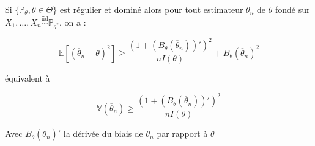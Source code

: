 \documentclass[12pt]{article}
\newif\ifcorrection
\newcommand{\corr}[1]{\ifcorrection{\color{lightblue}#1\color{black}}\fi}
\newcommand{\petitespace}{\vspace{0.5cm}}
\newcommand{\shift}{\hspace{2em}}
\newcommand{\bb}[1]{\mathbb{#1}} %
\renewcommand{\P}{\bb{P}}%
\renewcommand{\d}{\partial} %
\newcommand{\somme}[2]{\sum\limits_{#1}^{#2}}
\renewcommand{\cal}{\mathcal}
\newcommand{\Xunan}{X_1,\ldots,X_n} %
\newcommand{\esp}[1]{\bb{ E} \mathopen{}\left[#1\right]} %
\newcommand{\Var}[1]{\bb{ V} \mathopen{}\left(#1\right)} %
\newcommand{\cov}{\text{Cov}}
\newcommand{\modelstat}{\{ \P_\theta, \theta \in \Theta\}}
\newcommand{\esptheta}[1]{\bb{E}_\theta[#1]}
\newcommand{\simiid}{\overset{\text{iid}}{\sim}}
\newcommand{\1}{\bb{1}} %
\begin{document}
Si $\modelstat$ est régulier et dominé alors pour tout estimateur $\overline \theta_n$ de $\theta$ fondé sur $\Xunan \simiid \P_{\theta^*}$, on a : 

$$\esp{(\overline \theta_n-\theta)^2} \ge \frac{(1+(B_\theta(\overline \theta_n))')^2}{nI(\theta)} + B_\theta(\overline \theta_n)^2 $$

équivalent à 

$$\Var{\overline \theta_n} \ge \frac{(1+(B_\theta(\overline \theta_n))')^2}{nI(\theta)}$$

Avec $B_\theta(\overline \theta_n)'$ la dérivée du biais de $\overline \theta_n$ par rapport à $\theta$

\petitespace
\corr{\textbf{Preuve :}

Notons $s_n(X, \theta)=\somme{i=1}{n}l'(X_i, \theta)$. Par Cauchy Schwarz on a 

$$\cov(s_n(X, \theta))\le \Var{s_n(X, \theta)}\Var{\overline \theta_n}$$

Premièrement, on a par régularité du modèle :

$$\Var{s_n(X, \theta)} \overset{iid}{=} \somme{i=1}{n}\Var{l'(X_i, \theta)}=nI(\theta) \shift (1)$$ 

Deuxièmement, 

\begin{align*}
	\cov(s_n(X, \theta), \overline \theta_n) &= \esptheta{s_n(X, \theta)\overline \theta_n}-\esptheta{s_n(X, \theta)}\esptheta{\overline \theta_n}\\
	&=\esptheta{\somme{i=1}{n}l'(X_i, \theta)\overline \theta_n}\\
	&=\esptheta{\somme{i=1}{n}\frac{\d log(f(X_i, \theta))}{\d \theta}\overline \theta_n}\\
	&=\esptheta{\frac{\d log(L_n(\Xunan, \theta))}{\d \theta}\overline \theta_n}\\
	&=\int_{\cal X^n} \frac{\d log(L_n(\Xunan, \theta))}{\d \theta}L_n(\Xunan, \theta)\overline \theta_n d\mu(x_1,\ldots, x_n)\\
	\text{Par H2, H3}&=\frac{\d}{\d\theta}\int_{\cal X^n}L_n(\Xunan, \theta)\overline \theta_nd\mu(x_1,\ldots, x_n)\\
	&=\frac{\d}{\d\theta}\esptheta{\overline \theta_n}\\
	&=\frac{\d}{\d\theta}(B_\theta(\overline \theta_n)+\theta)\shift(2)\\
	&=(1+B_\theta(\overline \theta_n)')
\end{align*}

D'où en combinant $(1)$ et $(2)$ on a 

$$\Var{\overline \theta_n} \ge \frac{(1+(B_\theta(\overline \theta_n))')^2}{nI(\theta)} $$
}
\end{document}
